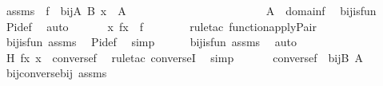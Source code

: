 \begin{isabellebody}
\ assms\ {\isacharcolon}{\kern0pt}\ {\isachardoublequoteopen}f\ {\isasymin}\ bij{\isacharparenleft}{\kern0pt}A{\isacharcomma}{\kern0pt}\ B{\isacharparenright}{\kern0pt}{\isachardoublequoteclose}\ {\isachardoublequoteopen}x\ {\isasymin}\ A{\isachardoublequoteclose}\ \ \ \ \ \ \ \ \ \ \ \ \ \ \ \ \ \ \ \isanewline
\ \ \isamarkupfalse%
\ \isamarkupfalse%
\ {\isachardoublequoteopen}A\ {\isasymsubseteq}\ domain{\isacharparenleft}{\kern0pt}f{\isacharparenright}{\kern0pt}{\isachardoublequoteclose}\ \isamarkupfalse%
\ bij{\isacharunderscore}{\kern0pt}is{\isacharunderscore}{\kern0pt}fun\ \isamarkupfalse%
\ Pi{\isacharunderscore}{\kern0pt}def\ \isamarkupfalse%
\ auto\ \isanewline
\ \ \isamarkupfalse%
\ \isamarkupfalse%
\ {\isachardoublequoteopen}{\isacharless}{\kern0pt}x{\isacharcomma}{\kern0pt}\ f{\isacharbackquote}{\kern0pt}x{\isachargreater}{\kern0pt}\ {\isasymin}\ f{\isachardoublequoteclose}\ \ \isanewline
\ \ \ \ \isamarkupfalse%
\ {\isacharparenleft}{\kern0pt}rule{\isacharunderscore}{\kern0pt}tac\ function{\isacharunderscore}{\kern0pt}apply{\isacharunderscore}{\kern0pt}Pair{\isacharparenright}{\kern0pt}\ \isamarkupfalse%
\ bij{\isacharunderscore}{\kern0pt}is{\isacharunderscore}{\kern0pt}fun\ assms\ \isamarkupfalse%
\ Pi{\isacharunderscore}{\kern0pt}def\ \isamarkupfalse%
\ simp\isanewline
\ \ \ \ \isamarkupfalse%
\ bij{\isacharunderscore}{\kern0pt}is{\isacharunderscore}{\kern0pt}fun\ assms\ \isamarkupfalse%
\ auto\isanewline
\ \ \isamarkupfalse%
\ \isamarkupfalse%
\ H{\isacharcolon}{\kern0pt}\ {\isachardoublequoteopen}{\isacharless}{\kern0pt}f{\isacharbackquote}{\kern0pt}x{\isacharcomma}{\kern0pt}\ x{\isachargreater}{\kern0pt}\ {\isasymin}\ converse{\isacharparenleft}{\kern0pt}f{\isacharparenright}{\kern0pt}{\isachardoublequoteclose}\ \isamarkupfalse%
\ {\isacharparenleft}{\kern0pt}rule{\isacharunderscore}{\kern0pt}tac\ converseI{\isacharparenright}{\kern0pt}\ \isamarkupfalse%
\ simp\ \isamarkupfalse%
\ \isanewline
\ \ \isamarkupfalse%
\ {\isachardoublequoteopen}converse{\isacharparenleft}{\kern0pt}f{\isacharparenright}{\kern0pt}\ {\isasymin}\ bij{\isacharparenleft}{\kern0pt}B{\isacharcomma}{\kern0pt}\ A{\isacharparenright}{\kern0pt}{\isachardoublequoteclose}\ \isamarkupfalse%
\ bij{\isacharunderscore}{\kern0pt}converse{\isacharunderscore}{\kern0pt}bij\ assms\ \isamarkupfalse%

\end{isabellebody}
